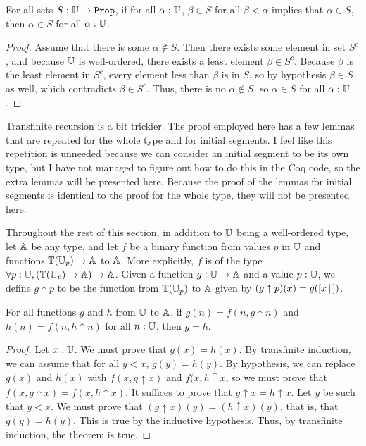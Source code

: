 \documentclass[../math.tex]{subfiles}
\begin{document}
\begin{theorem} \label{transfinite_induction}
    For all sets $S : \set{\U}$, if for all $\alpha : \mathbb{U}$, $\beta \in S$ for all
    $\beta < \alpha$ implies that $\alpha \in S$, then $\alpha \in S$ for all
    $\alpha : \mathbb{U}$.
\end{theorem}
\begin{proof}
    Assume that there is some $\alpha \notin S$.  Then there exists some element
    in set $S^c$, and because $\mathbb{U}$ is well-ordered, there exists a least element
    $\beta \in S^c$.  Because $\beta$ is the least element in $S^c$, every
    element less than $\beta$ is in $S$, so by hypothesis $\beta \in S$ as well,
    which contradicts $\beta \in S^c$.  Thus, there is no $\alpha \notin S$, so
    $\alpha \in S$ for all $\alpha : \mathbb{U}$.
\end{proof}

Transfinite recursion is a bit trickier.  The proof employed here has a few
lemmas that are repeated for the whole type and for initial segments.  I feel
like this repetition is unneeded because we can consider an initial segment to
be its own type, but I have not managed to figure out how to do this in the Coq
code, so the extra lemmas will be presented here.  Because the proof of the
lemmas for initial segments is identical to the proof for the whole type, they
will not be presented here.

Throughout the rest of this section, in addition to $\mathbb{U}$ being a well-ordered
type, let $\mathbb{A}$ be any type, and let $f$ be a binary function from values $p$ in
$\mathbb{U}$ and functions $\mathbb{T}(\mathbb{U}_p) \to \mathbb{A}$ to $\mathbb{A}$.  More explicitly, $f$ is of the
type $\forall p : \mathbb{U}, (\mathbb{T}(\mathbb{U}_p) \to \mathbb{A}) \to \mathbb{A}$.  Given a function $g : \mathbb{U} \to
\mathbb{A}$ and a value $p : \mathbb{U}$, we define $g \uparrow p$ to be the function from
$\mathbb{T}(\mathbb{U}_p)$ to $\mathbb{A}$ given by $(g \uparrow p)(x) = g([ x\, |\,])$.

\begin{theorem}
    For all functions $g$ and $h$ from $\mathbb{U}$ to $\mathbb{A}$, if $g(n) = f(n, g \uparrow
    n)$ and $h(n) = f(n, h \uparrow n)$ for all $n : \mathbb{U}$, then $g = h$.
\end{theorem}
\begin{proof}
    Let $x : \mathbb{U}$.  We must prove that $g(x) = h(x)$.  By transfinite induction,
    we can assume that for all $y < x$, $g(y) = h(y)$.  By hypothesis, we can
    replace $g(x)$ and $h(x)$ with $f(x, g \uparrow x)$ and $f(x, h \uparrow x$,
    so we must prove that $f(x, g \uparrow x) = f(x, h \uparrow x)$.  It
    suffices to prove that $g \uparrow x = h \uparrow x$.  Let $y$ be such that
    $y < x$.  We must prove that $(g \uparrow x)(y) = (h \uparrow x)(y)$, that
    is, that $g(y) = h(y)$.  This is true by the inductive hypothesis.  Thus, by
    transfinite induction, the theorem is true.
\end{proof}
\end{document}
